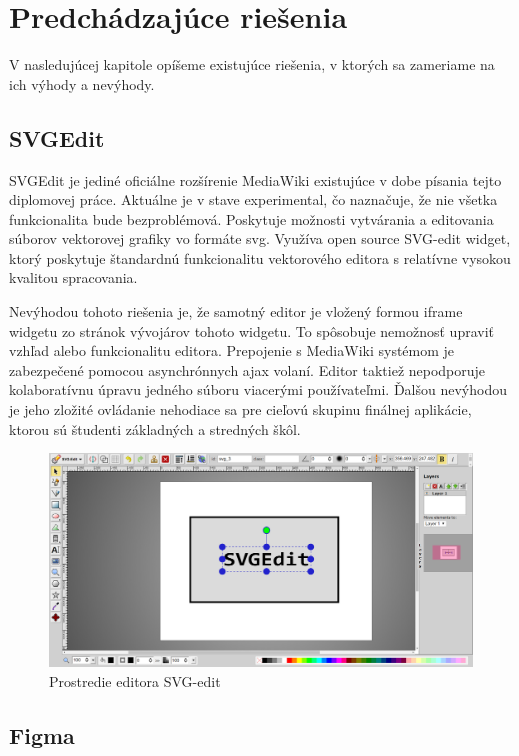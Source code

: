 \chapter{Predchádzajúce riešenia}\label{chap:previous_solutions}

V nasledujúcej kapitole opíšeme existujúce riešenia, v ktorých sa zameriame na ich výhody a nevýhody.

\section{SVGEdit}

SVGEdit je jediné oficiálne rozšírenie MediaWiki existujúce v dobe písania tejto diplomovej práce. Aktuálne je v stave experimental, čo naznačuje, že nie všetka funkcionalita bude bezproblémová. Poskytuje možnosti vytvárania a editovania súborov vektorovej grafiky vo formáte svg. Využíva open source SVG-edit widget, ktorý poskytuje štandardnú funkcionalitu vektorového editora s relatívne vysokou kvalitou spracovania. 

Nevýhodou tohoto riešenia je, že samotný editor je vložený formou iframe widgetu zo stránok vývojárov tohoto widgetu. To spôsobuje nemožnosť upraviť vzhľad alebo funkcionalitu editora. Prepojenie s MediaWiki systémom je zabezpečené pomocou asynchrónnych ajax volaní. Editor taktiež nepodporuje kolaboratívnu úpravu jedného súboru viacerými používateľmi. Ďalšou nevýhodou je jeho zložité ovládanie nehodiace sa pre cieľovú skupinu finálnej aplikácie, ktorou sú študenti základných a stredných škôl.

\begin{figure}[h]
	\centerline{\includegraphics[width=1\textwidth]{images/svg-edit}}
	\caption[Editor SVG-edit]{Prostredie editora SVG-edit}
	\label{obr:SVGedit}
\end{figure}
\FloatBarrier


\section{Figma}

